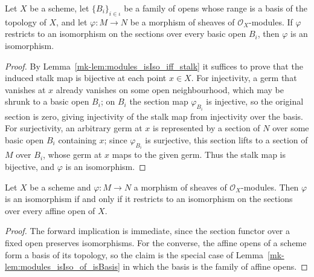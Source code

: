 \begin{lemma}\label{mk-lem:modules_isIso_of_isBasis}
  \leanok

  Let \(X\) be a scheme, let \(\{B_i\}_{i \in \iota}\) be a family of opens whose
  range is a basis of the topology of \(X\), and let \(\varphi : M \to N\) be a
  morphism of sheaves of \(\mathcal{O}_X\)-modules. If \(\varphi\) restricts to an
  isomorphism on the sections over every basic open \(B_i\), then \(\varphi\) is an
  isomorphism.
\end{lemma}

\begin{proof}
  \leanok
  By Lemma~\ref{mk-lem:modules_isIso_iff_stalk} it suffices to prove that the induced
  stalk map is bijective at each point \(x \in X\). For injectivity, a germ that
  vanishes at \(x\) already vanishes on some open neighbourhood, which may be
  shrunk to a basic open \(B_i\); on \(B_i\) the section map \(\varphi_{B_i}\) is
  injective, so the original section is zero, giving injectivity of the stalk map
  from injectivity over the basis. For surjectivity, an arbitrary germ at \(x\) is
  represented by a section of \(N\) over some basic open \(B_i\) containing \(x\);
  since \(\varphi_{B_i}\) is surjective, this section lifts to a section of \(M\)
  over \(B_i\), whose germ at \(x\) maps to the given germ. Thus the stalk map is
  bijective, and \(\varphi\) is an isomorphism.
\end{proof}

\begin{lemma}\label{mk-lem:modules_isIso_iff_affineOpens}
  \leanok

  Let \(X\) be a scheme and \(\varphi : M \to N\) a morphism of sheaves of
  \(\mathcal{O}_X\)-modules. Then \(\varphi\) is an isomorphism if and only if it
  restricts to an isomorphism on the sections over every affine open of \(X\).
\end{lemma}

\begin{proof}
  \leanok
  The forward implication is immediate, since the section functor over a fixed open
  preserves isomorphisms. For the converse, the affine opens of a scheme form a
  basis of its topology, so the claim is the special case of
  Lemma~\ref{mk-lem:modules_isIso_of_isBasis} in which the basis is the family of
  affine opens.
\end{proof}

